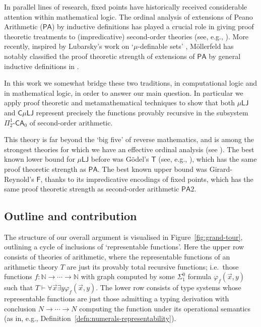 \documentclass[10pt,a4paper]{amsart}
\theoremstyle{plain}
\theoremstyle{definition}
\renewcommand{\phi}{\varphi}
\theoremstyle{plain}
\theoremstyle{definition} %
\newcommand{\Nat}{\mathbb{N}}
\newcommand{\nat}{\mathit{N}}
\newcommand{\LJ}{\mathsf{LJ}}
\newcommand{\T}{\mathsf{T}}
\newcommand{\F}{\mathsf{F}}
\newcommand{\muLJ}{\mu\LJ}
\newcommand{\circular}{\mathsf C}
\newcommand{\cmuLJ}{\circular\muLJ}
\newcommand{\proves}{\vdash}
\newcommand{\Pin}[2]{\Pi^{#1}_{#2}}
\newcommand{\PA}{\mathsf{PA}}
\newcommand{\SOPA}{\PA2}
\newcommand{\CA}{\mathsf{CA}}
\newcommand{\ca}[1]{#1\text{-}\CA}
\newcommand{\PSCA}{\ca{\Pin 1 2 }_0}
\begin{document}

In parallel lines of research, fixed points have historically received considerable attention within mathematical logic.
The ordinal analysis of extensions of Peano Arithmetic ($\PA$) by inductive definitions has played a crucial role in giving proof theoretic treatments to (impredicative) second-order theories (see, e.g., \cite{sep-proof-theory}).
More recently, inspired by Lubarsky's work on `$\mu$-definable sets' \cite{Lubarsky93}, M\"ollerfeld has notably classified the proof theoretic strength of extensions of $\PA$ by general inductive definitions in \cite{Moellerfeld02:phd-thesis}.


In this work we somewhat bridge these two traditions, in computational logic and in mathematical logic, in order to answer our main question.
In particular we apply proof theoretic and metamathematical techniques to show that both $\muLJ$ and $\cmuLJ$ represent precisely the functions provably recursive in the subsystem $\PSCA$ of second-order arithmetic.

This theory is far beyond the `big five' of reverse mathematics, and is among the strongest theories for which we have an effective ordinal analysis (see \cite{Rathjen95:recent-advances}). 
The best known lower bound for $\muLJ$ before was G\"odel's $\T$ (see, e.g., \cite{Clairambault09}), which has the same proof theoretic strength as $\PA$. 
The best known upper bound was Girard-Reynold's $\F$, thanks to its impredicative encodings of fixed points, which has the same proof theoretic strength as second-order arithmetic $\SOPA$.



\subsection{Outline and contribution}
The structure of our overall argument is visualised in Figure~\ref{fig:grand-tour}, outlining a cycle of inclusions of `representable functions'.
Here the upper row consists of theories of arithmetic, where the representable functions of an arithmetic theory $T$ are just its provably total recursive functions; i.e.\ those functions $ f : \Nat \to \cdots \to \Nat$ with graph computed by some $\Sigma^0_1$ formula $\phi_f(\vec x, y)$ such that $T \proves \forall \vec x \exists y \phi_f (\vec x,y) $.
The lower row consists of type systems whose representable functions are just those admitting a typing derivation with conclusion $\nat \to \cdots \to \nat$ computing the function under its operational semantics (as in, e.g., Definition~\ref{defn:numerals-representability}). 
\end{document}
